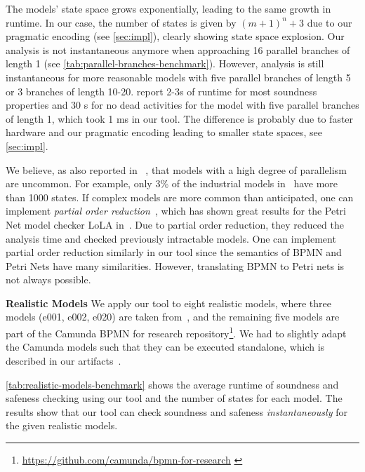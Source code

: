 \documentclass[runningheads]{llncs}
\newcommand{\subpart}[1]{\vspace{1em}\noindent\textbf{#1}}
\begin{document}
The models' state space grows exponentially, leading to the same growth in runtime.
In our case, the number of states is given by $(m+1)^n + 3$ due to our pragmatic encoding (see \autoref{sec:impl}), clearly showing state space explosion.
Our analysis is not instantaneous anymore when approaching 16 parallel branches of length 1 (see \autoref{tab:parallel-branches-benchmark}).
However, analysis is still instantaneous for more reasonable models with five parallel branches of length 5 or 3 branches of length 10-20.
\cite{corradiniFormalApproachAnalysis2021} report 2-3s of runtime for most soundness properties and 30 s for no dead activities for the model with five parallel branches of length 1, which took 1 ms in our tool.
The difference is probably due to faster hardware and our pragmatic encoding leading to smaller state spaces, see \autoref{sec:impl}.


We believe, as also reported in ~\cite{fahlandAnalysisDemandInstantaneous2011}, that models with a high degree of parallelism are uncommon.
For example, only 3\% of the industrial models in~\cite{fahlandAnalysisDemandInstantaneous2011} have more than 1000 states.
If complex models are more common than anticipated, one can implement \textit{partial order reduction}~\cite{clarkeHandbookModelChecking2018}, which has shown great results for the Petri Net model checker LoLA in~\cite{fahlandAnalysisDemandInstantaneous2011}.
Due to partial order reduction, they reduced the analysis time and checked previously intractable models.
One can implement partial order reduction similarly in our tool since the semantics of BPMN and Petri Nets have many similarities.
However, translating BPMN to Petri nets is not always possible. %

\subpart{Realistic Models}
We apply our tool to eight realistic models, where three models (e001, e002, e020) are taken from~\cite{houhouFirstOrderLogicVerification2022}, and the remaining five models are part of the Camunda BPMN for research repository\footnote{\url{https://github.com/camunda/bpmn-for-research} \label{footnote:camundaResearch}}.
We had to slightly adapt the Camunda models such that they can be executed standalone, which is described in our artifacts~\cite{noauthorgivenBPM2024Artifacts2024}.

\autoref{tab:realistic-models-benchmark} shows the average runtime of soundness and safeness checking using our tool and the number of states for each model.
The results show that our tool can check soundness and safeness \textit{instantaneously} for the given realistic models.
\end{document}
